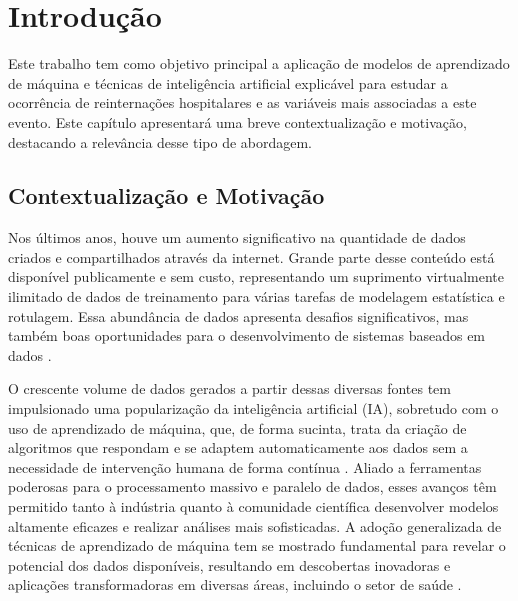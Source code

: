 
\chapter[Introdução]{Introdução}
\label{Introdução}

Este trabalho tem como objetivo principal a aplicação de modelos de aprendizado de máquina e técnicas de inteligência artificial explicável para estudar a ocorrência de reinternações hospitalares e as variáveis mais associadas a este evento. Este capítulo apresentará uma breve contextualização e motivação, destacando a relevância desse tipo de abordagem.

\section{Contextualização e Motivação}\label{sec-context}

Nos últimos anos, houve um aumento significativo na quantidade de dados criados e compartilhados através da internet. Grande parte desse conteúdo está disponível publicamente e sem custo, representando um suprimento virtualmente ilimitado de dados de treinamento para várias tarefas de modelagem estatística e rotulagem. Essa abundância de dados apresenta desafios significativos, mas também boas oportunidades para o desenvolvimento de sistemas baseados em dados \cite{SeltzerZ09}.

O crescente volume de dados gerados a partir dessas diversas fontes tem impulsionado uma popularização da inteligência artificial (IA), sobretudo com o uso de aprendizado de máquina, que, de forma sucinta, trata da criação de algoritmos que respondam e se adaptem automaticamente aos dados sem a necessidade de intervenção humana de forma contínua \cite{chiavegatto2015}. Aliado a ferramentas poderosas para o processamento massivo e paralelo de dados, esses avanços têm permitido tanto à indústria quanto à comunidade científica desenvolver modelos altamente eficazes e realizar análises mais sofisticadas. A adoção generalizada de técnicas de aprendizado de máquina tem se mostrado fundamental para revelar o potencial dos dados disponíveis, resultando em descobertas inovadoras e aplicações transformadoras em diversas áreas, incluindo o setor de saúde \cite{mlaplicadosaude}.

